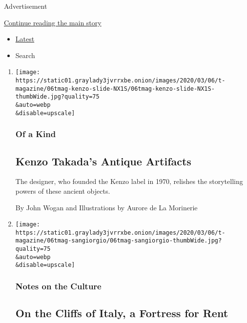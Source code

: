 Advertisement

\protect\hyperlink{after-mid1}{Continue reading the main story}

\begin{itemize}
\tightlist
\item
  \protect\hyperlink{stream-panel}{Latest}
\item
  Search
\end{itemize}

\begin{enumerate}
\def\labelenumi{\arabic{enumi}.}
\item
  \href{/2020/03/06/t-magazine/kenzo-takada-antique-artifacts.html}{}

  \texttt{[image: https://static01.graylady3jvrrxbe.onion/images/2020/03/06/t-magazine/06tmag-kenzo-slide-NX1S/06tmag-kenzo-slide-NX1S-thumbWide.jpg?quality=75\\\&auto=webp\\\&disable=upscale]}

  \hypertarget{of-a-kind}{%
  \subsubsection{Of a Kind}\label{of-a-kind}}

  \hypertarget{kenzo-takadas-antique-artifacts}{%
  \subsection{Kenzo Takada's Antique
  Artifacts}\label{kenzo-takadas-antique-artifacts}}

  The designer, who founded the Kenzo label in 1970, relishes the
  storytelling powers of these ancient objects.

  By John Wogan and Illustrations by Aurore de La Morinerie
\item
  \href{/2020/03/06/t-magazine/forte-san-giorgio.html}{}

  \texttt{[image: https://static01.graylady3jvrrxbe.onion/images/2020/03/06/t-magazine/06tmag-sangiorgio/06tmag-sangiorgio-thumbWide.jpg?quality=75\\\&auto=webp\\\&disable=upscale]}

  \hypertarget{notes-on-the-culture-1}{%
  \subsubsection{Notes on the Culture}\label{notes-on-the-culture-1}}

  \hypertarget{on-the-cliffs-of-italy-a-fortress-for-rent}{%
  \subsection{On the Cliffs of Italy, a Fortress for
  Rent}\label{on-the-cliffs-of-italy-a-fortress-for-rent}}


\end{enumerate}
